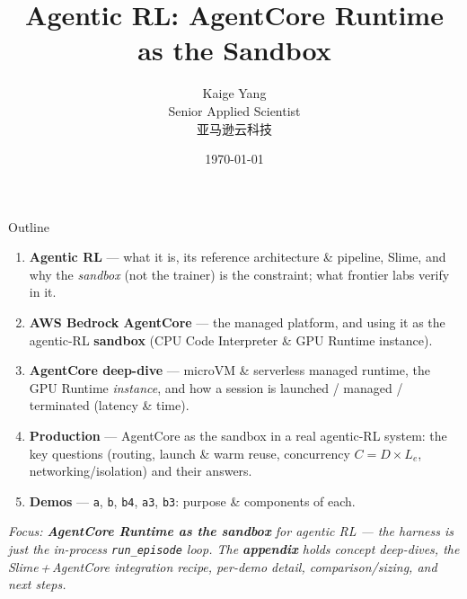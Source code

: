 \documentclass[aspectratio=169]{beamer}
\title[Agentic RL]{Agentic RL: AgentCore Runtime as the Sandbox}
\author[Kaige Yang]{Kaige Yang \\ Senior Applied Scientist \\ 亚马逊云科技}
\date{\today}
\begin{document}
\begin{frame}
  \titlepage
\end{frame}

\begin{frame}{Outline}
  \small
  \begin{enumerate}\setlength\itemsep{0.3em}
    \item \textbf{Agentic RL} --- what it is, its reference architecture \& pipeline, Slime, and why
      the \emph{sandbox} (not the trainer) is the constraint; what frontier labs verify in it.
    \item \textbf{AWS Bedrock AgentCore} --- the managed platform, and using it as the agentic-RL
      \textbf{sandbox} (CPU Code Interpreter \& GPU Runtime instance).
    \item \textbf{AgentCore deep-dive} --- microVM \& serverless managed runtime, the GPU Runtime
      \emph{instance}, and how a session is launched / managed / terminated (latency \& time).
    \item \textbf{Production} --- AgentCore as the sandbox in a real agentic-RL system: the key
      questions (routing, launch \& warm reuse, concurrency $C=D\times L_e$, networking/isolation) and their answers.
    \item \textbf{Demos} --- \texttt{a}, \texttt{b}, \texttt{b4}, \texttt{a3}, \texttt{b3}:
      purpose \& components of each.
  \end{enumerate}
  \vspace{0.4em}
  {\footnotesize\itshape Focus: \textbf{AgentCore Runtime as the sandbox} for agentic RL --- the harness
  is just the in-process \texttt{run\_episode} loop. The \textbf{appendix} holds concept deep-dives, the
  Slime\,+\,AgentCore integration recipe, per-demo detail, comparison/sizing, and next steps.}
\end{frame}
\end{document}
